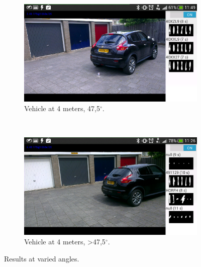 \begin{figure}[H]
        \centering
        \begin{subfigure}{0.50\textwidth}
            \includegraphics[width=\textwidth]{plaatjes/test-4m-47,5a}
            \caption{Vehicle at 4 meters, 47,5$^{\circ}$.}
            \label{fig:4m-47.5a}
        \end{subfigure}%
        ~ 
        \begin{subfigure}{0.50\textwidth}
            \includegraphics[width=\textwidth]{plaatjes/test-4m-47,5a+}
            \caption{Vehicle at 4 meters, \textgreater 47,5$^{\circ}$.}
            \label{fig:4m-47.5a-more}
        \end{subfigure}%

        \caption{Results at varied angles.}
        \label{fig:angle-test}
\end{figure}%

